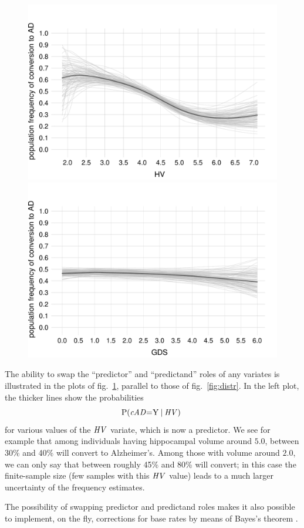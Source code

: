 \begin{figure}[t]
\centering%
\includegraphics[width=0.45\linewidth]{figures/prob_conversion_HV.pdf}\hfill%
\includegraphics[width=0.45\linewidth]{figures/prob_conversion_GDS.pdf}%
\\ \caption{}\label{fig:distr_inv}
\end{figure}
The ability to swap the ``predictor'' and ``predictand'' roles of any variates is illustrated in the plots of fig.~\ref{fig:distr_inv}, parallel to those of fig.~\ref{fig:distr}. In the left plot, the thicker lines show the probabilities
\begin{equation*}
  \P( \cAD \mo \yy \| \HV)\
\end{equation*}
for various values of the $\mathit{HV}$ variate, which is now a predictor.
We see for example that among individuals having hippocampal volume around $5.0$, between 30\% and 40\% will convert to Alzheimer's. Among those with volume around $2.0$, we can only say that between roughly 45\% and 80\% will convert; in this case the finite-sample size (few samples with this $\mathit{HV}$ value) leads to a much larger uncertainty of the frequency estimates.

The possibility of swapping predictor and predictand roles makes it also possible to implement, on the fly, corrections for base rates by means of Bayes's theorem \cite[\S\,4]{lindleyetal1981}.%

\medskip

